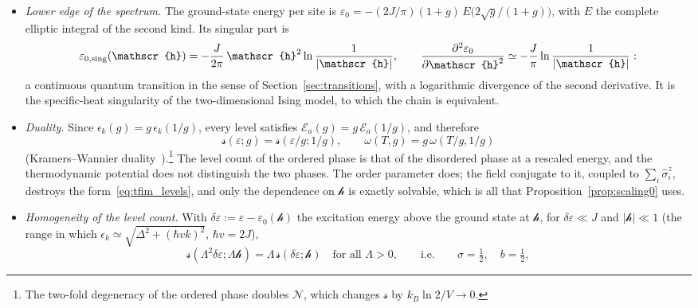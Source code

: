 \documentclass[10pt,a4paper]{article}
\theoremstyle{plain}
\newcommand{\cN}{\mathcal{N}}   %
\newcommand{\hfield}{\mathscr{h}}  %
\newcommand{\enrg}{\mathcal{E}}  %
\newcommand{\lds}{\mathscr{s}}  %
\begin{document}
\begin{itemize}\setlength{\itemsep}{0pt}
\item \emph{Lower edge of the spectrum.} The ground-state energy per site is
  $\varepsilon_0=-(2J/\pi)(1+g)\,E\big(2\sqrt g/(1+g)\big)$, with $E$ the
  complete elliptic integral of the second kind. Its singular part is
  \begin{equation}\label{eq:tfim_ground}
    \varepsilon_{0,\rm sing}(\hfield)=-\frac{J}{2\pi}\,\hfield^{2}\ln\frac{1}{|\hfield|} ,
    \qquad
    \frac{\partial^{2}\varepsilon_0}{\partial\hfield^{2}}\simeq-\frac{J}{\pi}\ln\frac{1}{|\hfield|} :
  \end{equation}
  a continuous quantum transition in the sense of
  Section~\ref{sec:transitions}, with a logarithmic divergence of the
  second derivative. It is the specific-heat singularity of the
  two-dimensional Ising model, to which the chain is equivalent.
\item \emph{Duality.} Since $\epsilon_k(g)=g\,\epsilon_k(1/g)$, every level
  satisfies $\enrg_a(g)=g\,\enrg_a(1/g)$, and therefore
  \begin{equation}\label{eq:tfim_duality}
    \lds(\varepsilon;g)=\lds(\varepsilon/g;1/g) ,
    \qquad
    \omega(T,g)=g\,\omega(T/g,1/g)
  \end{equation}
  (Kramers--Wannier duality~\cite{KramersWannier1941}).\footnote{The two-fold
  degeneracy of the ordered phase doubles $\cN$, which changes $\lds$ by
  $k_B\ln2/V\to0$.} The level count of the ordered phase is that of the
  disordered phase at a rescaled energy, and the thermodynamic potential
  does not distinguish the two phases. The order parameter does; the field
  conjugate to it, coupled to $\sum_i\hat\sigma^{z}_i$, destroys the
  form~\eqref{eq:tfim_levels}, and only the dependence on $\hfield$ is
  exactly solvable, which is all that Proposition~\ref{prop:scaling0} uses.
\item \emph{Homogeneity of the level count.} With
  $\delta\varepsilon:=\varepsilon-\varepsilon_0(\hfield)$ the excitation
  energy above the ground state at $\hfield$, for $\delta\varepsilon\ll J$
  and $|\hfield|\ll1$ (the range in which
  $\epsilon_k\simeq\sqrt{\Delta^{2}+(\hbar vk)^{2}}$, $\hbar v=2J$),
  \begin{equation}\label{eq:tfim_hom}
    \lds(\Lambda^{2}\delta\varepsilon;\Lambda\hfield)=\Lambda\,\lds(\delta\varepsilon;\hfield)
    \quad\text{for all }\Lambda>0 ,
    \qquad\text{i.e.}\qquad
    \sigma=\tfrac12 ,\quad b=\tfrac12 ,
  \end{equation}

\end{itemize}
\end{document}
